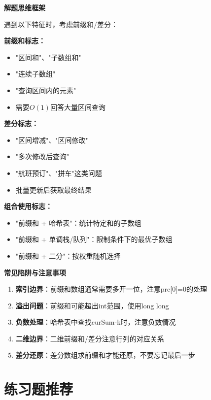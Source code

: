 \documentclass[12pt,a4paper]{article}
\begin{document}
	\begin{purplebox}
		\textbf{解题思维框架}
		
		遇到以下特征时，考虑前缀和/差分：
		
		\textbf{前缀和标志：}
		\begin{itemize}
			\item "区间和"、"子数组和"
			\item "连续子数组"
			\item "查询区间内的元素"
			\item 需要$O(1)$回答大量区间查询
		\end{itemize}
		
		\textbf{差分标志：}
		\begin{itemize}
			\item "区间增减"、"区间修改"
			\item "多次修改后查询"
			\item "航班预订"、"拼车"这类问题
			\item 批量更新后获取最终结果
		\end{itemize}
		
		\textbf{组合使用标志：}
		\begin{itemize}
			\item "前缀和 + 哈希表"：统计特定和的子数组
			\item "前缀和 + 单调栈/队列"：限制条件下的最优子数组
			\item "前缀和 + 二分"：按权重随机选择
		\end{itemize}
	\end{purplebox}
	
	\begin{redbox}
		\textbf{常见陷阱与注意事项}
		
		\begin{enumerate}
			\item \textbf{索引边界}：前缀和数组通常需要多开一位，注意pre[0]=0的处理
			\item \textbf{溢出问题}：前缀和可能超出int范围，使用long long
			\item \textbf{负数处理}：哈希表中查找curSum-k时，注意负数情况
			\item \textbf{二维边界}：二维前缀和/差分注意行列的对应关系
			\item \textbf{差分还原}：差分数组求前缀和才能还原，不要忘记最后一步
		\end{enumerate}
	\end{redbox}
	
	\section{练习题推荐}
	
\end{document}
